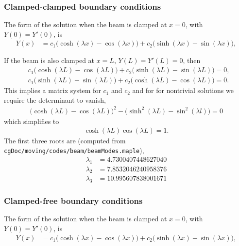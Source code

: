 \documentclass[11pt]{article}
\begin{document}
\subsubsection{Clamped-clamped boundary conditions} 

The form of the solution when the beam is clamped at $x=0$, with $Y(0)=Y'(0)$, is 
\begin{align*}
    Y(x) &= c_1 \big(\cosh(\lambda x) -\cos(\lambda x) \big) + c_2 \big(\sinh(\lambda x) - \sin(\lambda x)\big),
\end{align*}

If the beam is also clamped at $x=L$, $Y(L)=Y'(L)=0$, 
then
\begin{align*}
  &  c_1 \big(\cosh(\lambda L) -\cos(\lambda L) \big) + c_2 \big(\sinh(\lambda L) - \sin(\lambda L)\big) = 0 , \\
  &  c_1 \big(\sinh(\lambda L) +\sin(\lambda L) \big) + c_2 \big(\cosh(\lambda L) - \cos(\lambda L)\big) = 0 . 
\end{align*}
This implies a matrix system for $c_1$ and $c_2$ and for 
for nontrivial solutions we require the determinant to vanish, 
\begin{align*}
   \big(\cosh(\lambda L) -\cos(\lambda L) \big)^2 - \big( \sinh^2(\lambda L) - \sin^2(\lambda l) \big)=0
\end{align*}
which simplifies to
\begin{align*}
   \cosh(\lambda L)\cos(\lambda L) = 1 .
\end{align*}
The first three roots are (computed from {\tt cgDoc/moving/codes/beam/beamModes.maple}),
\begin{align*}
   \lambda_1 &=4.7300407448627040  \\
   \lambda_2 &=7.8532046240958376  \\
   \lambda_3 &=10.995607838001671
\end{align*}


\subsubsection{Clamped-free boundary conditions} 

The form of the solution when the beam is clamped at $x=0$, with $Y(0)=Y'(0)$, is 
\begin{align*}
    Y(x) &= c_1 \big(\cosh(\lambda x) -\cos(\lambda x) \big) + c_2 \big(\sinh(\lambda x) - \sin(\lambda x)\big),
\end{align*}
\end{document}
